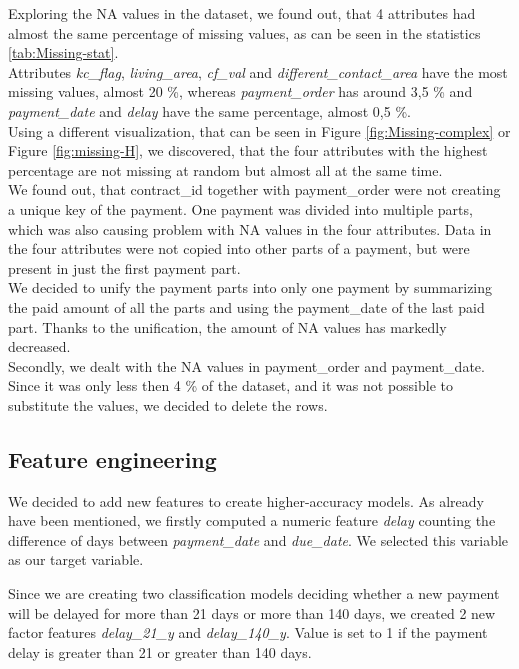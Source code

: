 \documentclass[
]{article}
\begin{document}
Exploring the NA values in the dataset, we found out, that 4 attributes had
almost the same percentage of missing values, as can be seen in the statistics \ref{tab:Missing-stat}.\\
Attributes \emph{kc\_flag}, \emph{living\_area}, \emph{cf\_val} and \emph{different\_contact\_area} have the most missing values, almost 20 \%, whereas \emph{payment\_order} has around 3,5 \% and \emph{payment\_date} and \emph{delay} have the same percentage, almost 0,5 \%.\\
Using a different visualization, that can be seen in Figure \ref{fig:Missing-complex} or Figure \ref{fig:missing-H}, we discovered, that the four attributes with the highest percentage are
not missing at random but almost all at the same time.\\
We found out, that contract\_id together with payment\_order were not creating a unique key of the payment. One payment was divided into multiple parts, which was also causing problem with NA values in the four attributes. Data in the four attributes were not copied into other parts of a payment, but were present in just the first payment part.\\
We decided to unify the payment parts into only one payment by summarizing the paid amount of all the parts and using the payment\_date of the last paid part. Thanks to the unification, the amount of NA values has markedly decreased.\\
Secondly, we dealt with the NA values in payment\_order and payment\_date. Since it was only less then 4 \% of the dataset, and it was not possible to substitute the values, we decided to delete the rows.

\hypertarget{feature-engineering}{%
\subsection{Feature engineering}\label{feature-engineering}}

We decided to add new features to create higher-accuracy models. As already have been mentioned, we firstly computed a numeric feature \emph{delay} counting the difference of days between \emph{payment\_date} and \emph{due\_date}. We selected this variable as our target variable.

Since we are creating two classification models deciding whether a new payment will be delayed
for more than 21 days or more than 140 days, we created 2 new factor features \emph{delay\_21\_y} and \emph{delay\_140\_y}. Value is set to 1 if the payment delay is greater than 21 or greater than 140 days.
\end{document}

